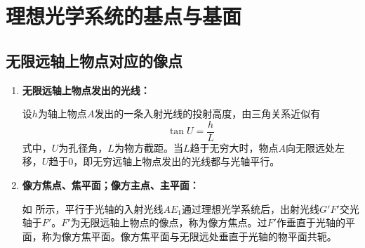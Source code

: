 \section{理想光学系统的基点与基面}
\subsection{无限远轴上物点对应的像点}
\label{subsect:infty-object}

\begin{enumerate}	
	\item \textbf{无限远轴上物点发出的光线：}
	
	设$h$为轴上物点$A$发出的一条入射光线的投射高度，由三角关系近似有
	\begin{equation}
		\tan U=\frac{h}{L}
	\end{equation}
	式中，$U$为孔径角，$L$为物方截距。当$L$趋于无穷大时，物点$A$向无限远处左移，$U$趋于$0$，即无穷远轴上物点发出的光线都与光轴平行。
	\item \textbf{像方焦点、焦平面；像方主点、主平面：}
	
	如 所示，平行于光轴的入射光线$AE_1$通过理想光学系统后，出射光线$G'F'$交光轴于$F'$。$F'$为无限远轴上物点的像点，称为像方焦点。过$F'$作垂直于光轴的平面，称为像方焦平面。像方焦平面与无限远处垂直于光轴的物平面共轭。


\end{enumerate}
